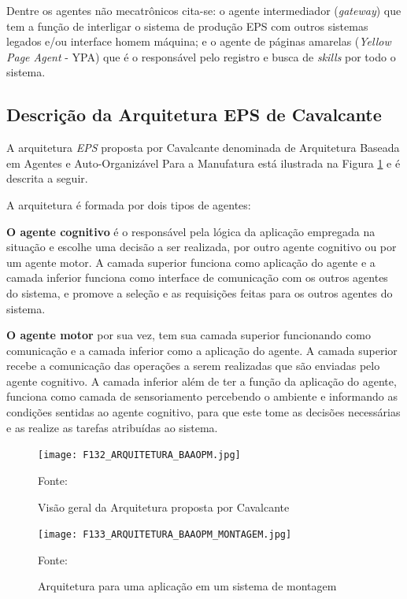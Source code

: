 Dentre os agentes não mecatrônicos cita-se: o agente intermediador (\textit{gateway}) que tem a função de interligar o sistema de produção EPS com outros sistemas legados e/ou interface homem máquina; e o agente de páginas amarelas (\textit{Yellow Page Agent} - YPA) que é o responsável pelo registro e busca de \textit{skills} por todo o sistema.


\subsection{Descrição da Arquitetura EPS de Cavalcante }
 	 	  
A arquitetura \textit{EPS} proposta por Cavalcante denominada de Arquitetura Baseada em Agentes e Auto-Organizável Para a Manufatura  está ilustrada na Figura \ref{F132} e é descrita a seguir.

A arquitetura é formada por dois tipos de agentes:
 	 
 \textbf{O agente cognitivo} é o responsável pela lógica da aplicação empregada na situação e escolhe uma decisão a ser realizada, por outro agente cognitivo ou por um agente motor. A camada superior funciona como aplicação do agente e  a camada inferior funciona como interface de comunicação com os outros agentes do sistema, e promove a seleção e as requisições feitas para os outros agentes do sistema.
 	 	  
  \textbf{O agente motor} por sua vez, tem sua camada superior funcionando como comunicação e a camada inferior como a aplicação do agente. A camada superior recebe a comunicação das operações a serem realizadas que são enviadas pelo agente cognitivo. A camada inferior além de ter a função da aplicação do agente, funciona como camada de sensoriamento percebendo o ambiente e informando as condições sentidas ao agente cognitivo, para que este tome as decisões necessárias e as realize as tarefas atribuídas ao sistema.
 	 	  
  	 	  \begin{figure}
  	 	  	\centering
  	 	  	\texttt{[image: F132\_ARQUITETURA\_BAAOPM.jpg]} 
  	 	  	\caption{Visão geral da Arquitetura proposta por Cavalcante}
  	 	  	\footnotesize{Fonte: \cite{CAVALCANTE2012a}}
  	 	  	\label{F132}
  	 	  \end{figure}
  	 	  
 	 	  \begin{figure}[b]
 	 	  	\centering
 	 	  	\texttt{[image: F133\_ARQUITETURA\_BAAOPM\_MONTAGEM.jpg]} 
 	 	  	\caption{Arquitetura para uma aplicação em um sistema de montagem}
 	 	  	\footnotesize{Fonte: \cite{CAVALCANTE2012a}}
 	 	  	\label{F133}
 	 	  \end{figure}	
 	 	  
